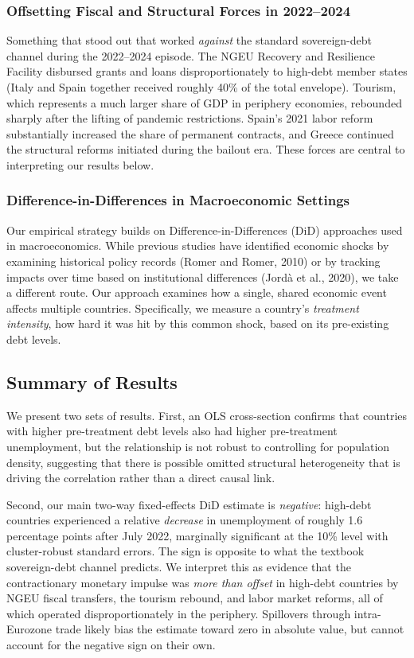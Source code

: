 \documentclass[11pt,a4paper]{article}
\begin{document}
\subsubsection{Offsetting Fiscal and Structural Forces in 2022--2024}

Something that stood out that worked \emph{against} the standard sovereign-debt channel during the 2022--2024 episode. The NGEU Recovery and Resilience Facility disbursed grants and loans disproportionately to high-debt member states (Italy and Spain together received roughly 40\% of the total envelope). Tourism, which represents a much larger share of GDP in periphery economies, rebounded sharply after the lifting of pandemic restrictions. Spain's 2021 labor reform substantially increased the share of permanent contracts, and Greece continued the structural reforms initiated during the bailout era. These forces are central to interpreting our results below.

\subsubsection{Difference-in-Differences in Macroeconomic Settings}

Our empirical strategy builds on Difference-in-Differences (DiD) approaches used in macroeconomics. While previous studies have identified economic shocks by examining historical policy records (Romer and Romer, 2010) or by tracking impacts over time based on institutional differences (Jord\`{a} et al., 2020), we take a different route. Our approach examines how a single, shared economic event affects multiple countries. Specifically, we measure a country's \emph{treatment intensity}, how hard it was hit by this common shock, based on its pre-existing debt levels.

\subsection{Summary of Results}

We present two sets of results. First, an OLS cross-section confirms that countries with higher pre-treatment debt levels also had higher pre-treatment unemployment, but the relationship is not robust to controlling for population density, suggesting that there is possible omitted structural heterogeneity that is driving the correlation rather than a direct causal link.

Second, our main two-way fixed-effects DiD estimate is \emph{negative}: high-debt countries experienced a relative \emph{decrease} in unemployment of roughly 1.6 percentage points after July 2022, marginally significant at the 10\% level with cluster-robust standard errors. The sign is opposite to what the textbook sovereign-debt channel predicts. We interpret this as evidence that the contractionary monetary impulse was \emph{more than offset} in high-debt countries by NGEU fiscal transfers, the tourism rebound, and labor market reforms, all of which operated disproportionately in the periphery. Spillovers through intra-Eurozone trade likely bias the estimate toward zero in absolute value, but cannot account for the negative sign on their own.
\end{document}
